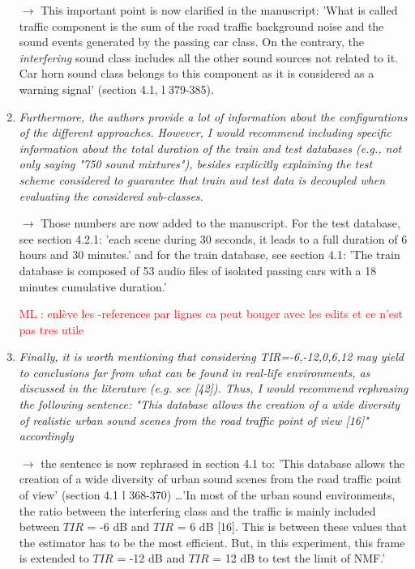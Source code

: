 \documentclass[10pt]{article}
\newcommand{\ml}[1]{\textcolor{red}{ML : #1}}
\begin{document}
\begin{enumerate}
$\rightarrow$ This important point is now clarified in the manuscript: 'What is called traffic component is the sum of the road traffic background noise and the sound events generated by the passing car class. On the contrary, the \textit{interfering} sound class includes all the other sound sources not related to it. Car horn sound class belongs to this component as it is considered as a warning signal' (section 4.1, l 379-385).


\item \emph{Furthermore, the authors provide a lot of information about the configurations of the different approaches. However, I would recommend including specific information about the total duration of the train and test databases (e.g., not only saying "750 sound mixtures"), besides explicitly explaining the test scheme considered to guarantee that train and test data is decoupled when evaluating the considered sub-classes.}

$\rightarrow$ Those numbers are now added to the manuscript. For the test database, see section 4.2.1: 'each scene during 30 seconds, it leads to a full duration of 6 hours and 30 minutes.' and for the train database, see section 4.1: 'The train database is composed of 53 audio files of isolated passing cars with a 18 minutes cumulative duration.'

\ml{enlève les -references par lignes ca peut bouger avec les edits et ce n'est pas tres utile}


\item \emph{Finally, it is worth mentioning that considering TIR={-6,-12,0,6,12} may yield to conclusions far from what can be found in real-life environments, as discussed in the literature (e.g. see [42]). Thus, I would recommend rephrasing the following sentence: "This database allows the creation of a wide diversity of realistic urban sound scenes from the road traffic point of view [16]" accordingly}

$\rightarrow$ the sentence is now rephrased in section 4.1 to: 'This database allows the creation of a wide diversity of urban sound scenes from the road traffic point of view' (section 4.1 l 368-370) \dots 'In most of the urban sound environments, the ratio between the interfering class and the traffic is mainly included between $TIR$ = -6 dB and $TIR$ = 6 dB [16]. This is between these values that the estimator has to be the most efficient. But, in this experiment, this frame is extended to $TIR$ = -12 dB and $TIR$ = 12 dB to test the limit of NMF.'

\end{enumerate}
\end{document}
